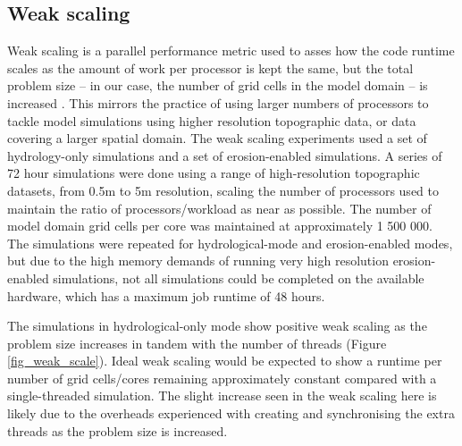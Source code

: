 \subsection{Weak scaling}

Weak scaling is a parallel performance metric used to asses how the code runtime scales as the amount of work per processor is kept the same, but the total problem size -- in our case, the number of grid cells in the model domain -- is increased \citep{gustafson1988reevaluating}. This mirrors the practice of using larger numbers of processors to tackle model simulations using higher resolution topographic data, or data covering a larger spatial domain. The weak scaling experiments used a set of hydrology-only simulations and a set of erosion-enabled simulations. A series of 72 hour simulations were done using a range of high-resolution topographic datasets, from 0.5m to 5m resolution, scaling the number of processors used to maintain the ratio of processors/workload as near as possible. The number of model domain grid cells per core was maintained at approximately 1 500 000. The simulations were repeated for hydrological-mode and erosion-enabled modes, but due to the high memory demands of running very high resolution erosion-enabled simulations, not all simulations could be completed on the available hardware, which has a maximum job runtime of 48 hours.

The simulations in hydrological-only mode show positive weak scaling as the problem size increases in tandem with the number of threads (Figure \ref{fig_weak_scale}). Ideal weak scaling would be expected to show a runtime per number of grid cells/cores remaining approximately constant compared with a single-threaded simulation. The slight increase seen in the weak scaling here is likely due to the overheads experienced with creating and synchronising the extra threads as the problem size is increased.

